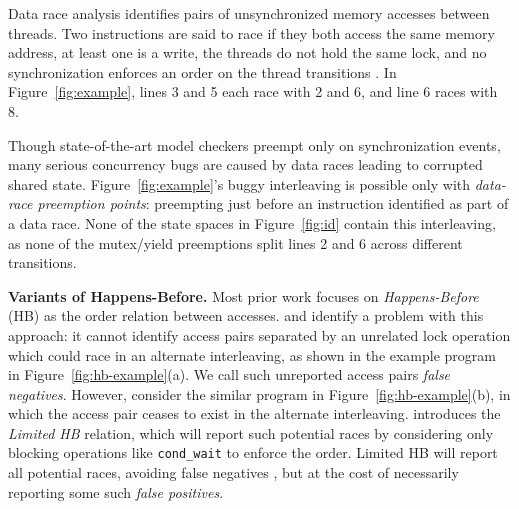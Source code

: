Data race analysis \cite{eraser} identifies pairs of unsynchronized memory accesses between threads.
Two instructions are said to race if
they both access the same memory address,
at least one is a write,
the threads do not hold the same lock,
and no synchronization enforces an order on the thread transitions .
In Figure~\ref{fig:example}, lines 3 and 5 each race with 2 and 6, and line 6 races with 8.



Though state-of-the-art model checkers preempt only on synchronization events,
many serious concurrency bugs are caused by data races leading to corrupted shared state.
Figure~\ref{fig:example}'s buggy interleaving is possible only with {\em data-race preemption points}:
preempting just before an instruction identified as part of a data race.
None of the state spaces in Figure~\ref{fig:id} contain this interleaving,
as none of the mutex/yield preemptions split lines 2 and 6 across different transitions.

	{\bf Variants of Happens-Before.}
	Most prior work focuses on {\em Happens-Before} (HB) \cite{lamport-clocks,djit,fasttrack} as the order relation between accesses.
\cite{predictive-dr} and \cite{hybriddatarace} identify a problem with this approach:
it cannot identify access pairs separated by an unrelated lock operation which could race in an alternate interleaving,
as shown in the example program in Figure~\ref{fig:hb-example}(a).
We call such unreported access pairs {\em false negatives}.
However, consider the similar program in Figure~\ref{fig:hb-example}(b),
in which the access pair ceases to exist in the alternate interleaving.
\cite{hybriddatarace} introduces the {\em Limited HB} relation,
which will report such potential races
by considering only blocking operations like {\tt cond\_wait} to enforce the order.
Limited HB will report all potential races, avoiding  false negatives \cite{tsan},
but at the cost of necessarily reporting some such {\em false positives}.

